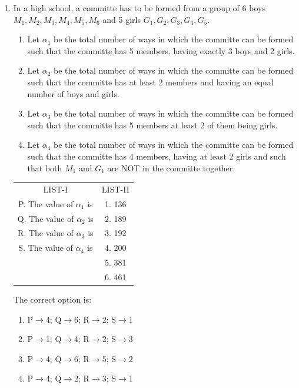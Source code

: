 \documentclass[journal,12pt,twocolumn]{IEEEtran}
\begin{document}
\begin{enumerate}
\item In a high school, a committe has to be formed from a group of 6 boys $M_1,M_2,M_3,M_4,M_5,M_6$ and 5 girls $G_1,G_2,G_3,G_4,G_5.$
\begin{enumerate}
\item Let $\alpha_1$ be the total number of ways in which the committe can be formed such that the committe has 5 members, having exactly 3 boys and 2 girls.
\item Let $\alpha_2$ be the total number of ways in which the committe can be formed such that the committe has at least 2 members and having an equal number of boys and girls.
\item Let $\alpha_3$ be the total number of ways in which the committe can be formed such that the committe has 5 members at least 2 of them being girls.
\item Let $\alpha_4$ be the total number of ways in which the committe can be formed such that the committe has 4 members, having at least 2 girls and such that both $M_1$ and $G_1$ are NOT in the committe together.
\end{enumerate}
\begin{table}[h!]
\centering
\begin{tabular}{c c} 
 LIST-I & LIST-II\\ [0.5ex] 
 P. The value of $\alpha_1$ is & 1. 136 \\ 
 Q. The value of $\alpha_2$ is & 2. 189\\
 R. The value of $\alpha_3$ is & 3. 192\\
 S. The value of $\alpha_4$ is & 4. 200\\
 & 5. 381\\
 & 6. 461\\ [1ex] 
\end{tabular}
\end{table}
The correct option is:\\
\begin{enumerate}
\item P$\rightarrow$4; Q$\rightarrow$6; R$\rightarrow$2; S$\rightarrow$1
\item P$\rightarrow$1; Q$\rightarrow$4; R$\rightarrow$2; S$\rightarrow$3
\item P$\rightarrow$4; Q$\rightarrow$6; R$\rightarrow$5; S$\rightarrow$2
\item P$\rightarrow$4; Q$\rightarrow$2; R$\rightarrow$3; S$\rightarrow$1
\end{enumerate}

\end{enumerate}
\end{document}
